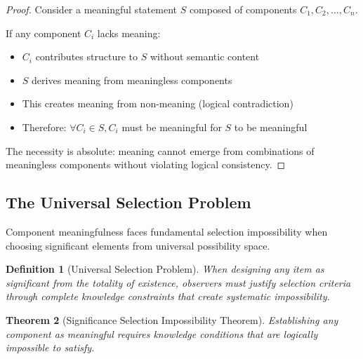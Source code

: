 \documentclass[12pt,a4paper]{article}
\newtheorem{theorem}{Theorem}[section]
\newtheorem{definition}[theorem]{Definition}
\begin{document}
\begin{proof}
Consider a meaningful statement $S$ composed of components $C_1, C_2, \ldots, C_n$.

If any component $C_i$ lacks meaning:
\begin{itemize}
\item $C_i$ contributes structure to $S$ without semantic content
\item $S$ derives meaning from meaningless components
\item This creates meaning from non-meaning (logical contradiction)
\item Therefore: $\forall C_i \in S, C_i$ must be meaningful for $S$ to be meaningful
\end{itemize}

The necessity is absolute: meaning cannot emerge from combinations of meaningless components without violating logical consistency.
\end{proof}

\subsection{The Universal Selection Problem}

Component meaningfulness faces fundamental selection impossibility when choosing significant elements from universal possibility space.

\begin{definition}[Universal Selection Problem]
When designing any item as significant from the totality of existence, observers must justify selection criteria through complete knowledge constraints that create systematic impossibility.
\end{definition}

\begin{theorem}[Significance Selection Impossibility Theorem]
 Establishing any component as meaningful requires knowledge conditions that are logically impossible to satisfy.
\end{theorem}
\end{document}
